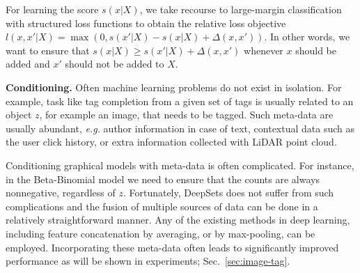 \documentclass{article}
\newcommand{\refsec}[1]{Sec.~\ref{#1}}
\newcommand{\latinphrase}[1]{\emph{#1}}    %
\newcommand{\eg}{\latinphrase{e.g.}\xspace}
\newcommand{\deepsets}{DeepSets\xspace}
\begin{document}
For learning the score $s(x|X)$, we take recourse to large-margin classification with structured loss functions \cite{TasGueKol04} to obtain the relative loss objective
$l(x,x'|X) = \max(0, s(x'|X) - s(x|X) + \Delta(x,x'))$.
In other words, we want to ensure that $s(x|X) \geq s(x'|X) + \Delta(x,x')$ whenever $x$ should be added and $x'$ should not be added to $X$.

\textbf{Conditioning.}
Often machine learning problems do not exist in isolation. For example, task like tag completion from a given set of tags is usually related to an object $z$, for example an image, that needs to be tagged. Such meta-data are usually abundant, \eg author information in case of text, contextual data such as the user click history, or extra information collected with LiDAR point cloud. 

Conditioning graphical models with meta-data is often complicated. 
For instance, in the Beta-Binomial model we need to ensure that the counts are always nonnegative, regardless of $z$.
Fortunately, \deepsets does not suffer from such complications and the fusion of multiple sources of data can be done in a relatively straightforward manner. Any of the existing methods in deep learning, including  feature concatenation by averaging, or by max-pooling, can be employed. Incorporating these meta-data often leads to significantly improved performance as will be shown in experiments; \refsec{sec:image-tag}.

\vspace*{-5pt}
\end{document}
